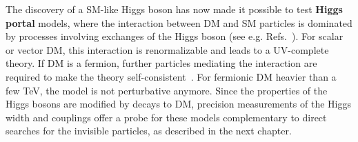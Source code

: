 The discovery of a SM-like Higgs boson
has now made it possible to test \textbf{Higgs portal} models, where the interaction between DM and SM particles is dominated by processes involving exchanges of the Higgs boson (see e.g. Refs.~\cite{Patt:2006fw,Englert:2011yb,Djouadi:2011aa}). For scalar or vector DM, this interaction is renormalizable and leads to a UV-complete theory. If DM is a fermion, further particles mediating the interaction are required to make the theory self-consistent~\cite{Freitas:2015hsa,Escudero:2016gzx,deSimone:2014pda}. 
For fermionic DM heavier than a few TeV, the model is not perturbative anymore. 
Since the properties of the Higgs bosons are modified by decays to DM, precision measurements of the Higgs width and couplings offer a probe for these models complementary to direct searches for the invisible particles, as described in the next chapter. 



